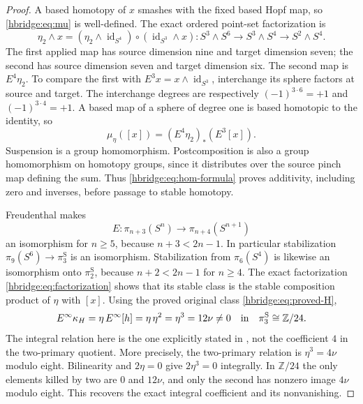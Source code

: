 \documentclass[11pt]{article}
\theoremstyle{definition}
\begin{document}
\begin{proof}
A based homotopy of \(x\) smashes with the fixed based Hopf map,
so \eqref{hbridge:eq:mu} is well-defined. The exact ordered
point-set factorization is
\begin{equation}
\eta_2\wedge x
=(\eta_2\wedge\operatorname{id}_{S^4})
 \circ(\operatorname{id}_{S^3}\wedge x):
S^3\wedge S^6\longrightarrow S^3\wedge S^4
\longrightarrow S^2\wedge S^4.
\label{hbridge:eq:factorization}
\end{equation}
The first applied map has source dimension nine and target dimension
seven; the second has source dimension seven and target dimension six.
The second map is \(E^4\eta_2\). To compare the first with
\(E^3x=x\wedge\operatorname{id}_{S^3}\), interchange its sphere
factors at source and target. The interchange degrees are respectively
\((-1)^{3\cdot6}=+1\) and \((-1)^{3\cdot4}=+1\). A based map
of a sphere of degree one is based homotopic to the identity, so
\begin{equation}
\mu_\eta([x])=(E^4\eta_2)_*(E^3[x]).
\label{hbridge:eq:hom-formula}
\end{equation}
Suspension is a group homomorphism. Postcomposition is also a group
homomorphism on homotopy groups, since it distributes over the
source pinch map defining the sum. Thus
\eqref{hbridge:eq:hom-formula} proves additivity, including zero
and inverses, before passage to stable homotopy.

Freudenthal makes
\[
E:\pi_{n+3}(S^n)\longrightarrow\pi_{n+4}(S^{n+1})
\]
an isomorphism for \(n\ge5\), because \(n+3<2n-1\).
In particular stabilization
\(\pi_9(S^6)\to\pi_3^{\mathrm S}\) is an isomorphism.
Stabilization from \(\pi_6(S^4)\) is likewise an isomorphism
onto \(\pi_2^{\mathrm S}\), because \(n+2<2n-1\) for
\(n\ge4\). The exact factorization
\eqref{hbridge:eq:factorization} shows that its stable class is
the stable composition product of \(\eta\) with \([x]\).
Using the proved original class \eqref{hbridge:eq:proved-H},
\begin{equation}
E^\infty\kappa_H
=\eta\,E^\infty[h]
=\eta\,\eta^2
=\eta^3
=12\nu\ne0\quad\hbox{in}\quad
\pi_3^{\mathrm S}\cong\mathbb Z/24.
\label{hbridge:eq:stable-product}
\end{equation}
The integral relation here is the one explicitly stated in
\cite[p.~385]{hbridgebib:HBHatcher}, not the coefficient \(4\) in the
two-primary quotient. More precisely, the two-primary relation
is \(\eta^3=4\nu\) modulo eight. Bilinearity and \(2\eta=0\)
give \(2\eta^3=0\) integrally. In \(\mathbb Z/24\) the only
elements killed by two are \(0\) and \(12\nu\), and only the
second has nonzero image \(4\nu\) modulo eight. This recovers
the exact integral coefficient and its nonvanishing.


\end{proof}
\end{document}
